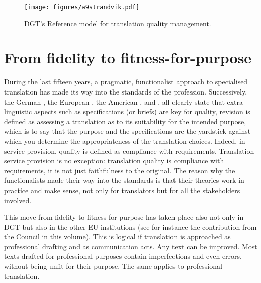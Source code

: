 \documentclass[output=paper]{langsci/langscibook}
\begin{document}
\begin{figure}
\caption{\label{fig:strandvik}
{{ DGT's} }{Reference model for translation quality management.}
}
\texttt{[image: figures/a9strandvik.pdf]}
\end{figure}
 

\section{From fidelity to fitness-for-purpose}\label{sec:strandvik:strandvic:5}

During the last fifteen years, a pragmatic, functionalist approach to specialised translation has made its way into the standards of the profession. Successively, the German \citeauthor{DIN1998},  the European \citeauthor{EN2006}, the American \citeauthor{ASTM2014}, and \citeauthor{ISO2012}, \citeauthor{ISO2015} all clearly state that extra-linguistic aspects such as specifications (or briefs) are key for quality, revision is defined as assessing a translation as to its suitability for the intended purpose, which is to say that the purpose and the specifications are the yardstick against which you determine the appropriateness of the translation choices. Indeed, in service provision, quality is defined as compliance with requirements. Translation service provision is no exception: translation quality is compliance with requirements, it is not just faithfulness to the original. The reason why the functionalists made their way into the standards is that their theories work in practice and make sense, not only for translators but for all the stakeholders involved.

This move from fidelity to fitness-for-purpose has taken place also not only in DGT but also in the other EU institutions (see for instance the contribution from the Council in this volume). This is logical if translation is approached as professional drafting and as communication acts. Any text can be improved. Most texts drafted for professional purposes contain imperfections and even errors, without being unfit for their purpose. The same applies to professional translation. 
\end{document}
